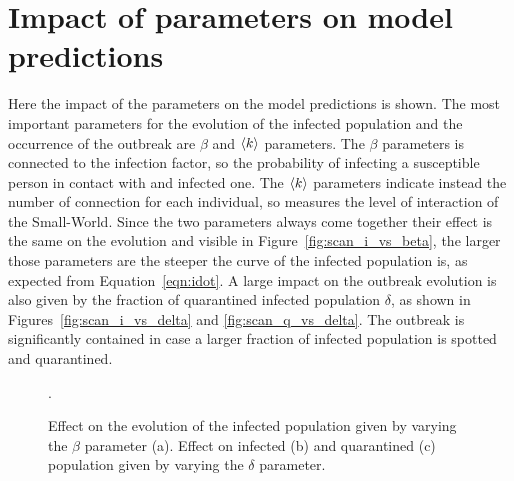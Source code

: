 \section{Impact of parameters on model predictions}
Here the impact of the parameters on the model predictions is shown. The most important parameters for the evolution of the infected population and the occurrence of the outbreak are $\beta$ and $\braket{k}$ parameters. The $\beta$ parameters is connected to the infection factor, so the probability of infecting a susceptible person in contact with and infected one. The $\braket{k}$ parameters indicate instead the number of connection for each individual, so measures the level of interaction of the Small-World. Since the two parameters always come together their effect is the same on the evolution and visible in Figure~\ref{fig:scan_i_vs_beta}, the larger those parameters are the steeper the curve of the infected population is, as expected from Equation~\ref{eqn:idot}.  A large impact on the outbreak evolution is also given by the fraction of quarantined infected population $\delta$, as shown in Figures~\ref{fig:scan_i_vs_delta} and \ref{fig:scan_q_vs_delta}. The outbreak is significantly contained in case a larger fraction of infected population is spotted and quarantined.

\begin{figure}[!ht]\centering
{}
\caption{Effect on the evolution of the infected population given by varying the $\beta$ parameter (a). Effect on infected (b) and quarantined (c) population given by varying the $\delta$ parameter.}.
\end{figure}

